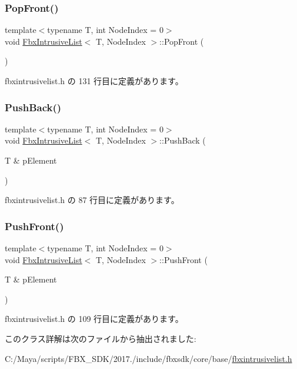 \subsubsection{\texorpdfstring{Pop\+Front()}{PopFront()}}
{\footnotesize\ttfamily template$<$typename T, int Node\+Index = 0$>$ \\
void \hyperlink{class_fbx_intrusive_list}{Fbx\+Intrusive\+List}$<$ T, Node\+Index $>$\+::Pop\+Front (\begin{DoxyParamCaption}{ }\end{DoxyParamCaption})\hspace{0.3cm}{\ttfamily [inline]}}



 fbxintrusivelist.\+h の 131 行目に定義があります。

\mbox{\label{class_fbx_intrusive_list_a44885493815547ff84cc6650a55defa7}} 
\subsubsection{\texorpdfstring{Push\+Back()}{PushBack()}}
{\footnotesize\ttfamily template$<$typename T, int Node\+Index = 0$>$ \\
void \hyperlink{class_fbx_intrusive_list}{Fbx\+Intrusive\+List}$<$ T, Node\+Index $>$\+::Push\+Back (\begin{DoxyParamCaption}\item[{T \&}]{p\+Element }\end{DoxyParamCaption})\hspace{0.3cm}{\ttfamily [inline]}}



 fbxintrusivelist.\+h の 87 行目に定義があります。

\mbox{\label{class_fbx_intrusive_list_a02701251943f1d1f72709954a5c76999}} 
\subsubsection{\texorpdfstring{Push\+Front()}{PushFront()}}
{\footnotesize\ttfamily template$<$typename T, int Node\+Index = 0$>$ \\
void \hyperlink{class_fbx_intrusive_list}{Fbx\+Intrusive\+List}$<$ T, Node\+Index $>$\+::Push\+Front (\begin{DoxyParamCaption}\item[{T \&}]{p\+Element }\end{DoxyParamCaption})\hspace{0.3cm}{\ttfamily [inline]}}



 fbxintrusivelist.\+h の 109 行目に定義があります。



このクラス詳解は次のファイルから抽出されました\+:\begin{DoxyCompactItemize}
\item 
C\+:/\+Maya/scripts/\+F\+B\+X\+\_\+\+S\+D\+K/2017./include/fbxsdk/core/base/\hyperlink{fbxintrusivelist_8h}{fbxintrusivelist.\+h}\end{DoxyCompactItemize}
